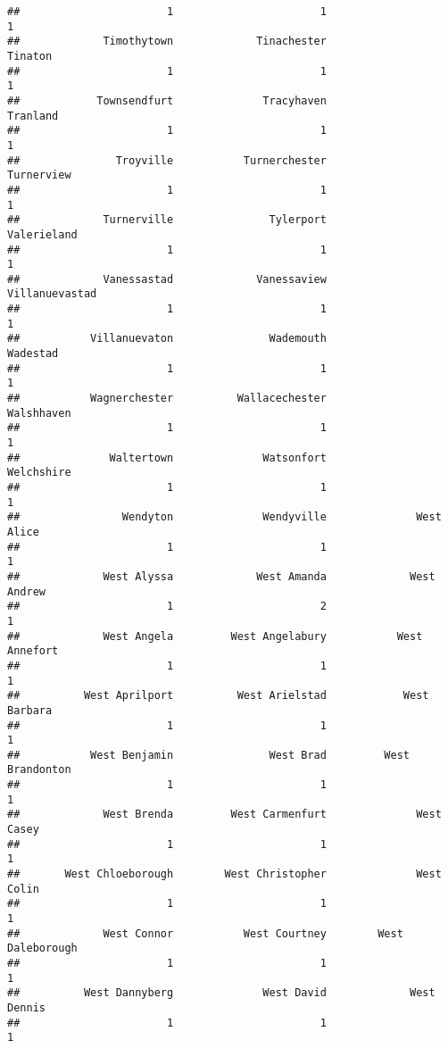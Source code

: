 \documentclass[
]{article}
\begin{document}
\begin{verbatim}
##                       1                       1                       1 
##             Timothytown             Tinachester                 Tinaton 
##                       1                       1                       1 
##            Townsendfurt              Tracyhaven                Tranland 
##                       1                       1                       1 
##               Troyville           Turnerchester              Turnerview 
##                       1                       1                       1 
##             Turnerville               Tylerport             Valerieland 
##                       1                       1                       1 
##             Vanessastad             Vanessaview          Villanuevastad 
##                       1                       1                       1 
##           Villanuevaton               Wademouth                Wadestad 
##                       1                       1                       1 
##           Wagnerchester          Wallacechester              Walshhaven 
##                       1                       1                       1 
##              Waltertown              Watsonfort              Welchshire 
##                       1                       1                       1 
##                Wendyton              Wendyville              West Alice 
##                       1                       1                       1 
##             West Alyssa             West Amanda             West Andrew 
##                       1                       2                       1 
##             West Angela         West Angelabury           West Annefort 
##                       1                       1                       1 
##          West Aprilport          West Arielstad            West Barbara 
##                       1                       1                       1 
##           West Benjamin               West Brad         West Brandonton 
##                       1                       1                       1 
##             West Brenda         West Carmenfurt              West Casey 
##                       1                       1                       1 
##       West Chloeborough        West Christopher              West Colin 
##                       1                       1                       1 
##             West Connor           West Courtney        West Daleborough 
##                       1                       1                       1 
##          West Dannyberg              West David             West Dennis 
##                       1                       1                       1 

\end{verbatim}
\end{document}
